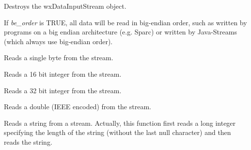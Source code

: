 


Destroys the wxDataInputStream object.



If {\it be\_order} is TRUE, all data will be read in big-endian
order, such as written by programs on a big endian architecture 
(e.g. Sparc) or written by Java-Streams (which always use 
big-endian order).
  


Reads a single byte from the stream.



Reads a 16 bit integer from the stream.



Reads a 32 bit integer from the stream.



Reads a double (IEEE encoded) from the stream.



Reads a string from a stream. Actually, this function first reads a long integer
specifying the length of the string (without the last null character) and then
reads the string.


\section{}\label{wxdataoutputstream}

